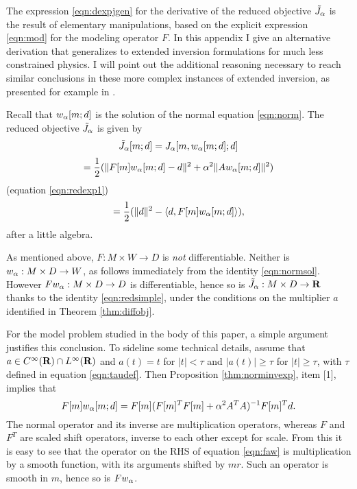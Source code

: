The expression \ref{eqn:dexpjgen} for the derivative of the reduced
objective $\tilde{J}_{\alpha}$ is the result of elementary manipulations, based on the
explicit expression \ref{eqn:mod} for the modeling operator $F$. In
this appendix I give an alternative derivation that generalizes to
extended inversion formulations for much less constrained physics. I
will point out the additional reasoning necessary to reach similar
conclusions in these more complex instances of extended inversion, as
presented for example in \cite{StolkSymes:03,StolkDeHoopSymes:09,Symes:IPTA14,tenKroode:IPTA14,HuangSymes:Geo17,HuangSymes:Geo18a,HuangSymes:Geo18b,HuangNammourSymesDollizal:SEG19}.

Recall that $w_{\alpha}[m;d]$ is the solution of the normal equation
\ref{eqn:norm}. The reduced objective $\tilde{J}_{\alpha}$ is given by
\[
  \tilde{J}_{\alpha}[m;d] = J_{\alpha}[m,w_{\alpha}[m;d];d]
\]
\[
  = \frac{1}{2}(\|F[m]w_{\alpha}[m;d]-d\|^2 + \alpha^2\|Aw_{\alpha}[m;d]\|^2)
\]
(equation \ref{eqn:redexp1})
\begin{equation}
  \label{eqn:redsimple}
  =\frac{1}{2}(\|d\|^2 - \langle d,F[m]w_{\alpha}[m;d]\rangle),
\end{equation}
after a little algebra.

As mentioned above, $F:M \times W \rightarrow D$ is {\em not}
differentiable. Neither is $w_{\alpha}: M \times D \rightarrow W$, as follows
immediately from the identity \ref{eqn:normsol}. However $Fw_{\alpha}: M
\times D \rightarrow D$ is differentiable, hence so is $\tilde{J}_{\alpha}: M \times
D \rightarrow {\bf R}$ thanks
to the identity \ref{eqn:redsimple},
under the conditions on the multiplier $a$ identified in Theorem
\ref{thm:diffobj}.

For the model problem studied in the body of this paper, a simple
argument justifies this conclusion.  To sideline some technical
details, assume that
$a \in C^{\infty}({\bf R})\cap L^{\infty}({\bf R})$ and $a(t)=t$ for $|t|<\tau$ and $|a(t)| \ge
\tau$ for $|t| \ge \tau$, with $\tau$
defined in equation \ref{eqn:taudef}. Then
Proposition \ref{thm:norminvexp}, item [1], implies that
\begin{equation}
  \label{eqn:faw}
  F[m]w_{\alpha}[m;d] = F[m](F[m]^TF[m] + \alpha^2 A^TA)^{-1}F[m]^T d.
\end{equation}
The normal operator and its inverse are multiplication
operators, whereas $F$ and $F^T$ are scaled shift operators, inverse
to each other except for scale. From this it is easy to see that the
operator on the RHS of equation \ref{eqn:faw} is multiplication by a
smooth function, with its arguments shifted by $mr$. Such an operator
is smooth in $m$, hence so is $Fw_{\alpha}$.

